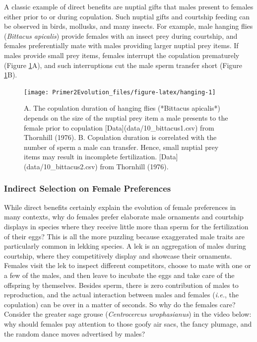 \documentclass[
]{book}
\begin{document}
A classic example of direct benefits are nuptial gifts that males present to females either prior to or during copulation. Such nuptial gifts and courtship feeding can be observed in birds, mollusks, and many insects. For example, male hanging flies (\emph{Bittacus apicalis}) provide females with an insect prey during courtship, and females preferentially mate with males providing larger nuptial prey items. If males provide small prey items, females interrupt the copulation prematurely (Figure \ref{fig:hanging}A), and such interruptions cut the male sperm transfer short (Figure \ref{fig:hanging}B).

\begin{figure}
\texttt{[image: Primer2Evolution\_files/figure-latex/hanging-1]} \caption{A. The copulation duration of hanging flies (*Bittacus apicalis*) depends on the size of the nuptial prey item a male presents to the female prior to copulation [Data](data/10_bittacus1.csv) from Thornhill (1976). B. Copulation duration is correlated with the number of sperm a male can transfer. Hence, small nuptial prey items may result in incomplete fertilization. [Data](data/10_bittacus2.csv) from Thornhill (1976).}\label{fig:hanging}
\end{figure}

\hypertarget{indirect-selection-on-female-preferences}{%
\subsubsection*{Indirect Selection on Female Preferences}\label{indirect-selection-on-female-preferences}}

While direct benefits certainly explain the evolution of female preferences in many contexts, why do females prefer elaborate male ornaments and courtship displays in species where they receive little more than sperm for the fertilization of their eggs? This is all the more puzzling because exaggerated male traits are particularly common in lekking species. A lek is an aggregation of males during courtship, where they competitively display and showcase their ornaments. Females visit the lek to inspect different competitors, choose to mate with one or a few of the males, and then leave to incubate the eggs and take care of the offspring by themselves. Besides sperm, there is zero contribution of males to reproduction, and the actual interaction between males and females (\emph{i.e.}, the copulation) can be over in a matter of seconds. So why do the females care? Consider the greater sage grouse (\emph{Centrocercus urophasianus}) in the video below: why should females pay attention to those goofy air sacs, the fancy plumage, and the random dance moves advertised by males?
\end{document}

